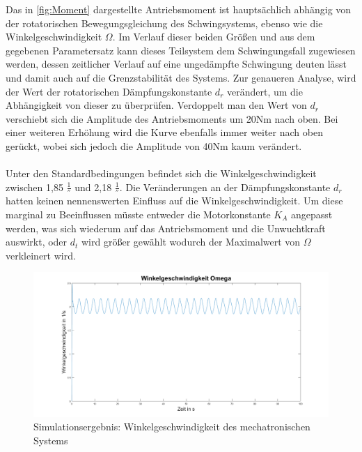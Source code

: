 Das in \ref{fig:Moment} dargestellte Antriebsmoment ist hauptsächlich abhängig von der rotatorischen Bewegungsgleichung des Schwingsystems, ebenso wie die Winkelgeschwindigkeit $\Omega$. Im Verlauf dieser beiden Größen und aus dem gegebenen Parametersatz kann dieses Teilsystem dem Schwingungsfall zugewiesen werden, dessen zeitlicher Verlauf auf eine ungedämpfte Schwingung deuten lässt und damit auch auf die Grenzstabilität des Systems. Zur genaueren Analyse, wird der Wert der rotatorischen Dämpfungskonstante $d_r$ verändert, um die Abhängigkeit von dieser zu überprüfen. 
Verdoppelt man den Wert von $d_r$ verschiebt sich die Amplitude des Antriebsmoments um 20Nm nach oben. Bei einer weiteren Erhöhung wird die Kurve ebenfalls immer weiter nach oben gerückt, wobei sich jedoch die Amplitude von 40Nm kaum verändert. \\ \\
Unter den Standardbedingungen befindet sich die Winkelgeschwindigkeit zwischen 1,85 $\frac{1}{\second}$ und 2,18 $\frac{1}{\second}$. Die Veränderungen an der Dämpfungskonstante $d_r$ hatten keinen nennenswerten Einfluss auf die Winkelgeschwindigkeit. Um diese marginal zu Beeinflussen müsste entweder die Motorkonstante $K_A$ angepasst werden, was sich wiederum auf das Antriebsmoment und die Unwuchtkraft auswirkt, oder $d_t$ wird größer gewählt wodurch der Maximalwert von $\Omega$ verkleinert wird. \\

\begin{figure}[hbt]
	\centering
	\includegraphics[width=1\linewidth]{Images/Omega}
	\caption{Simulationsergebnis: Winkelgeschwindigkeit des mechatronischen Systems}
	\label{fig:Omega}
\end{figure}

